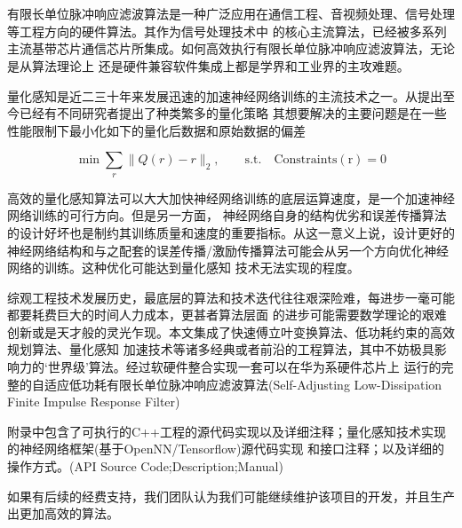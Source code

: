 \section{}


有限长单位脉冲响应滤波算法是一种广泛应用在通信工程、音视频处理、信号处理等工程方向的硬件算法。其作为信号处理技术中
的核心主流算法，已经被多系列主流基带芯片通信芯片所集成。如何高效执行有限长单位脉冲响应滤波算法，无论是从算法理论上
还是硬件兼容软件集成上都是学界和工业界的主攻难题。

量化感知是近二三十年来发展迅速的加速神经网络训练的主流技术之一。从提出至今已经有不同研究者提出了种类繁多的量化策略
其想要解决的主要问题是在一些性能限制下最小化如下的量化后数据和原始数据的偏差

\begin{equation*}
    \min \sum_{r} \| Q(r) - r\|_2,\qquad \mathrm{s.t.}\quad \mathrm{Constraints(r) = 0}
\end{equation*}

高效的量化感知算法可以大大加快神经网络训练的底层运算速度，是一个加速神经网络训练的可行方向。但是另一方面，
神经网络自身的结构优劣和误差传播算法的设计好坏也是制约其训练质量和速度的重要指标。从这一意义上说，设计更好的
神经网络结构和与之配套的误差传播/激励传播算法可能会从另一个方向优化神经网络的训练。这种优化可能达到量化感知
技术无法实现的程度。

综观工程技术发展历史，最底层的算法和技术迭代往往艰深险难，每进步一毫可能都要耗费巨大的时间人力成本，更甚者算法层面
的进步可能需要数学理论的艰难创新或是天才般的灵光乍现。本文集成了快速傅立叶变换算法、低功耗约束的高效规划算法、量化感知
加速技术等诸多经典或者前沿的工程算法，其中不妨极具影响力的`世界级'算法。经过软硬件整合实现一套可以在华为系硬件芯片上
运行的完整的自适应低功耗有限长单位脉冲响应滤波算法(Self-Adjusting Low-Dissipation Finite Impulse Response Filter)

附录中包含了可执行的C++工程的源代码实现以及详细注释；量化感知技术实现的神经网络框架(基于OpenNN/Tensorflow)源代码实现
和接口注释；以及详细的操作方式。(API Source Code;Description;Manual)

如果有后续的经费支持，我们团队认为我们可能继续维护该项目的开发，并且生产出更加高效的算法。